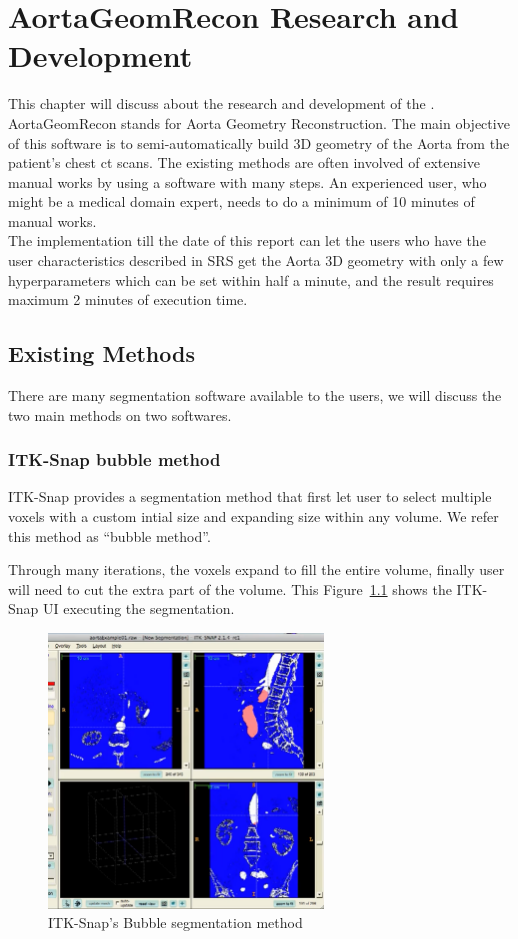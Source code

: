 \chapter{AortaGeomRecon Research and Development}
This chapter will discuss about the research and development of the \progname{}. \\
AortaGeomRecon stands for Aorta Geometry Reconstruction. The main objective of this software is to semi-automatically build 3D geometry of the Aorta from the patient's chest ct scans.  The existing methods are often involved of extensive manual works by using a software with many steps. An experienced user, who might be a medical domain expert, needs to do a minimum of 10 minutes of manual works. \\
The implementation till the date of this report can let the users who have the user characteristics described in SRS \citep{SRS} get the Aorta 3D geometry with only a few hyperparameters which can be set within half a minute, and the result requires maximum 2 minutes of execution time. \\


\section{Existing Methods}
There are many segmentation software available to the users, we will discuss the two main methods on two softwares.

\subsection{ITK-Snap bubble method} 
\indent
ITK-Snap provides a segmentation method that first let user to select multiple voxels with a custom intial size and expanding size within any volume. We refer this method as ``bubble method''.

Through many iterations, the voxels expand to fill the entire volume, finally user will need to cut the extra part of the volume. This Figure~\ref{fig_ITK} shows the ITK-Snap UI executing the segmentation.

\begin{figure}[ht]
    \centering
    \includegraphics[width=0.65\textwidth]{figures/Sample/ITK-Bubble-method.png}
    \caption[ITK-Snap's Bubble segmentation UI]{ITK-Snap's Bubble segmentation method}
    \label{fig_ITK}
\end{figure}

